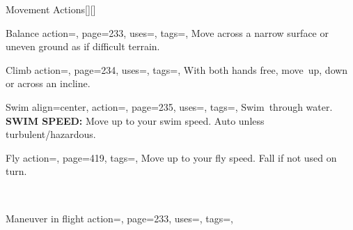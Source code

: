 \begin{PageBackLandscape}
\begin{TablesHalf}{\backTableHeight}
\begin{Table}{Movement Actions}[][]
            \breakLine
            \begin{entry}{Balance}{%
                action=,
                page=233,
                uses=\Acrobatics,
                tags=\Move,
            }
                Move across a narrow surface or uneven ground as if difficult terrain.\hfill {}\quad {}
            \end{entry}
            \begin{entry}{Climb}{%
                action=,
                page=234,
                uses=\Athletics,
                tags=\Move,
            }
                With both hands free, move \,\Feet up, down or across an incline.\hfill {}
            \end{entry}
            \begin{entry}{Swim}{%
                align=center,
                action=,
                page=235,
                uses=\Athletics,
                tags=\Move,
            }
                Swim \,\Feet through water.  \hfill { \hfill {}\hfill }\\%
                 \hfill \textbf{SWIM SPEED:} Move up to your swim
                speed. Auto
                 unless turbulent/hazardous.
            \end{entry}
            \breakLine
            \begin{entry}{Fly}{%
                action=,
                page=419,
                tags=\Move,
            }
                Move up to your fly speed. Fall if not used on turn. \hfill
                \parbox{0.5\linewidth}{\raggedleft
                \\
                }%
            \end{entry}
            \begin{entry}{Maneuver in flight}{%
                action=,
                page=233,
                uses={\Acrobatics[tags={T}]},
                tags=\Move,
            }

\end{entry}
\end{Table}
\end{TablesHalf}
\end{PageBackLandscape}
